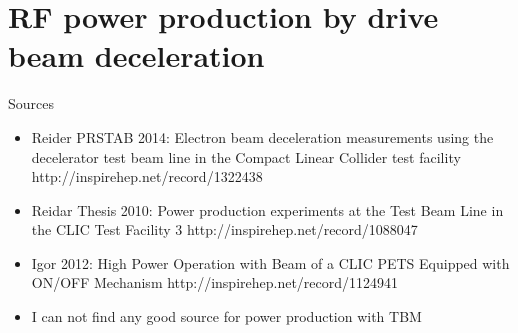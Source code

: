 \section{RF power production by drive beam deceleration}


Sources
\begin{itemize}
\item
Reider PRSTAB 2014: Electron beam deceleration measurements using the decelerator test beam line in the Compact Linear Collider test facility
http://inspirehep.net/record/1322438
\item
Reidar Thesis 2010: Power production experiments at the Test Beam Line in the CLIC Test Facility 3
http://inspirehep.net/record/1088047
\item
Igor 2012: High Power Operation with Beam of a CLIC PETS Equipped with ON/OFF Mechanism
http://inspirehep.net/record/1124941
\item
I can not find any good source for power production with TBM
\end{itemize}


